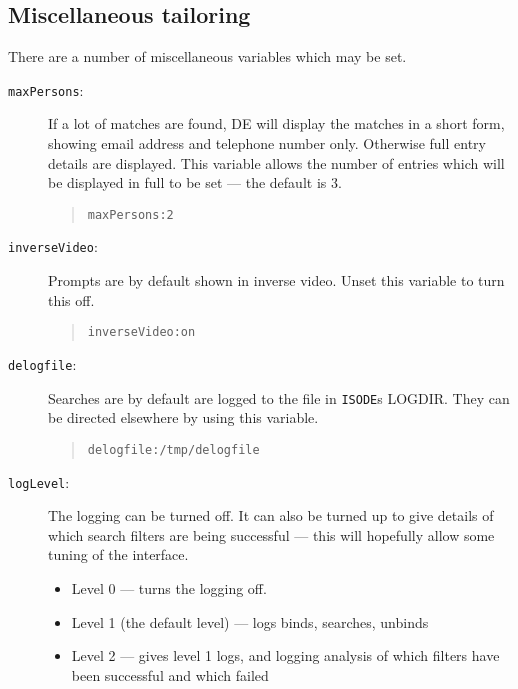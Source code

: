 \subsection{Miscellaneous tailoring}

There are a number of miscellaneous variables which may be set.

\begin{description}

\item [\verb+maxPersons+:]  If a lot of matches are found, DE will display the
matches in a short form, showing email address and telephone number only.
Otherwise full entry details are displayed.  This variable allows the number
of entries which will be displayed in full to be set --- the default is 3.

\begin{quote}\small\begin{verbatim}
maxPersons:2
\end{verbatim}\end{quote}

\item [\verb+inverseVideo+:]  Prompts are by default shown in inverse video.  
Unset this variable to turn this off.

\begin{quote}\small\begin{verbatim}
inverseVideo:on
\end{verbatim}\end{quote}

\item [\verb+delogfile+:]  Searches are by default are logged to the file
in \verb+ISODE+s LOGDIR.  They can be directed elsewhere by using this
variable.

\begin{quote}\small\begin{verbatim}
delogfile:/tmp/delogfile
\end{verbatim}\end{quote}

\item [\verb+logLevel+:]  The logging can be turned off. It can also be turned
up to give details of
which search filters are being successful --- this will hopefully allow some
tuning of the interface.

\begin{itemize}
\item Level 0 --- turns the logging off.
\item Level 1 (the default level) --- logs binds, searches, unbinds
\item Level 2 --- gives level 1 logs, and logging analysis of which
filters have been successful and which failed
\end{itemize}


\end{description}

